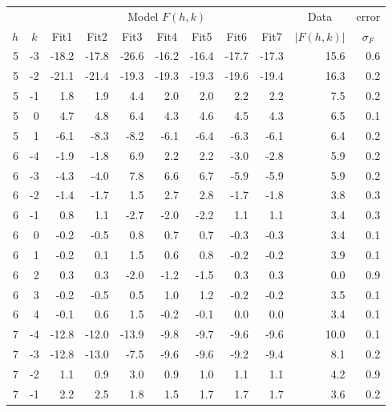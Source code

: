 \begin{table}[htbp]
\centering
\begin{tabular}{rrrrrrrrrrr}
\hline
& & \multicolumn{7}{c}{Model $F(h,k)$} & \multicolumn{1}{c}{Data} & \multicolumn{1}{c}{error} \\
\cline{3-9}
\multicolumn{1}{c}{$h$} & \multicolumn{1}{c}{$k$} & \multicolumn{1}{c}{Fit1} & \multicolumn{1}{c}{Fit2} & \multicolumn{1}{c}{Fit3} & \multicolumn{1}{c}{Fit4} & \multicolumn{1}{c}{Fit5} & \multicolumn{1}{c}{Fit6} & \multicolumn{1}{c}{Fit7} & \multicolumn{1}{c}{$|F(h,k)|$} & \multicolumn{1}{c}{$\sigma_F$} \\ 
\hline
5 & -3 & -18.2 & -17.8 & -26.6 & -16.2 & -16.4 & -17.7 & -17.3 & 15.6 & 0.6 \\ 
5 & -2 & -21.1 & -21.4 & -19.3 & -19.3 & -19.3 & -19.6 & -19.4 & 16.3 & 0.2 \\ 
5 & -1 & 1.8 & 1.9 & 4.4 & 2.0 & 2.0 & 2.2 & 2.2 & 7.5 & 0.2 \\ 
5 & 0 & 4.7 & 4.8 & 6.4 & 4.3 & 4.6 & 4.5 & 4.3 & 6.5 & 0.1 \\ 
5 & 1 & -6.1 & -8.3 & -8.2 & -6.1 & -6.4 & -6.3 & -6.1 & 6.4 & 0.2 \\ 
6 & -4 & -1.9 & -1.8 & 6.9 & 2.2 & 2.2 & -3.0 & -2.8 & 5.9 & 0.2 \\ 
6 & -3 & -4.3 & -4.0 & 7.8 & 6.6 & 6.7 & -5.9 & -5.9 & 5.9 & 0.2 \\ 
6 & -2 & -1.4 & -1.7 & 1.5 & 2.7 & 2.8 & -1.7 & -1.8 & 3.8 & 0.3 \\ 
6 & -1 & 0.8 & 1.1 & -2.7 & -2.0 & -2.2 & 1.1 & 1.1 & 3.4 & 0.3 \\ 
6 & 0 & -0.2 & -0.5 & 0.8 & 0.7 & 0.7 & -0.3 & -0.3 & 3.4 & 0.1 \\ 
6 & 1 & -0.2 & 0.1 & 1.5 & 0.6 & 0.8 & -0.2 & -0.2 & 3.9 & 0.1 \\ 
6 & 2 & 0.3 & 0.3 & -2.0 & -1.2 & -1.5 & 0.3 & 0.3 & 0.0 & 0.9 \\ 
6 & 3 & -0.2 & -0.5 & 0.5 & 1.0 & 1.2 & -0.2 & -0.2 & 3.5 & 0.1 \\ 
6 & 4 & -0.1 & 0.6 & 1.5 & -0.2 & -0.1 & 0.0 & 0.0 & 3.4 & 0.1 \\ 
7 & -4 & -12.8 & -12.0 & -13.9 & -9.8 & -9.7 & -9.6 & -9.6 & 10.0 & 0.1 \\ 
7 & -3 & -12.8 & -13.0 & -7.5 & -9.6 & -9.6 & -9.2 & -9.4 & 8.1 & 0.2 \\ 
7 & -2 & 1.1 & 0.9 & 3.0 & 0.9 & 1.0 & 1.1 & 1.1 & 4.2 & 0.9 \\ 
7 & -1 & 2.2 & 2.5 & 1.8 & 1.5 & 1.7 & 1.7 & 1.7 & 3.6 & 0.2 \\ 

\end{tabular}
\end{table}
